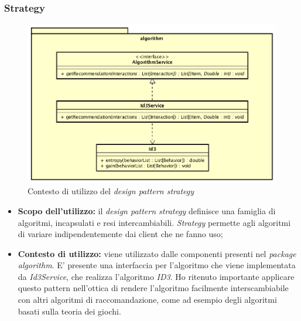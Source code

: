 \subsubsection{Strategy}
\begin{figure}[h]
\centering
\includegraphics[scale=0.30]{immagini/algorithm}
\caption{Contesto di utilizzo del \emph{design pattern strategy}}
\label{fig:pattern-strategy}
\end{figure}
\begin{itemize}
\item\textbf{Scopo dell'utilizzo:} il \emph{design pattern strategy} definisce una famiglia di algoritmi, incapsulati e resi intercambiabili. \emph{Strategy} permette agli algoritmi di variare indipendentemente dai client che ne fanno uso;
\item \textbf{Contesto di utilizzo:} viene utilizzato dalle componenti presenti nel \emph{package algorithm}. E' presente una interfaccia per l'algoritmo che viene implementata da \emph{Id3Service}, che realizza l'algoritmo \emph{ID3}. Ho ritenuto importante applicare questo pattern nell'ottica di rendere l'algoritmo facilmente interscambiabile con altri algoritmi di raccomandazione, come ad esempio degli algoritmi basati sulla teoria dei giochi.
\end{itemize}
